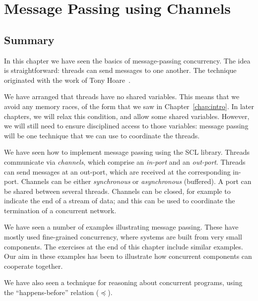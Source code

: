 \chapter{Message Passing using Channels} 



\section{Summary}

In this chapter we have seen the basics of message-passing concurrency.  The
idea is straightforward: threads can send messages to one another.  The
technique originated with the work of Tony Hoare~\cite{Hoare78}.

We have arranged that threads have no shared variables.  This means that we
avoid any memory races, of the form that we saw in Chapter~\ref{chap:intro}.
In later chapters, we will relax this condition, and allow some shared
variables.  However, we will still need to ensure disciplined access to those
variables: message passing will be one technique that we can use to
coordinate the threads.  

We have seen how to implement message passing using the SCL library.  Threads
communicate via \emph{channels}, which comprise an \emph{in-port} and an
\emph{out-port}.  Threads can send messages at an out-port, which are received
at the corresponding in-port.  Channels can be either \emph{synchronous} or
\emph{asynchronous} (buffered).  A port can be shared between several threads.
Channels can be closed, for example to indicate the end of a stream of data;
and this can be used to coordinate the termination of a concurrent network.

We have seen a number of examples illustrating message passing.  These have
mostly used fine-grained concurrency, where systems are built from very small
components.  The exercises at the end of this chapter include similar
examples.  Our aim in these examples has been to illustrate how concurrent
components can cooperate together.

We have also seen a technique for reasoning about concurrent programs, using
the ``happens-before'' relation ($\preceq$).


